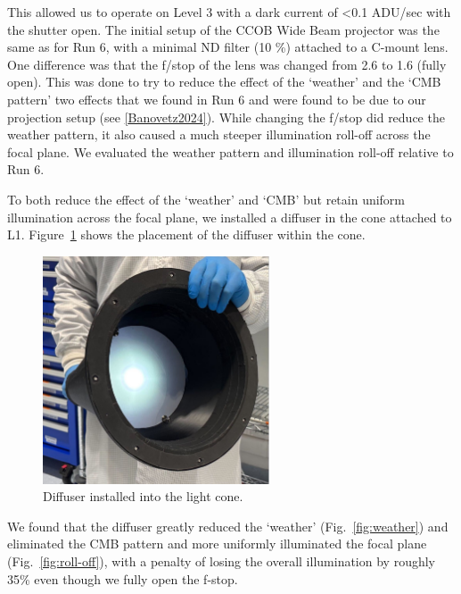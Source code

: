 This allowed us to operate on Level 3 with a dark current of
\textless0.1 ADU/sec with the shutter open. The initial setup of the
CCOB Wide Beam projector was the same as for Run 6, with a minimal ND filter (10 \%)
attached to a C-mount lens. One difference was that the f/stop of the lens
was changed from 2.6 to 1.6 (fully open). This was done to try to
reduce the effect of the `weather' and
the `CMB pattern' two effects that we
found in Run 6 and were found to be due to our projection setup (see
\hyperref[Banovetz2024]{{[}Banovetz2024{]}}). While changing  the f/stop  did
reduce the weather pattern, it also caused a much steeper illumination roll-off
across the focal plane. We evaluated the weather pattern and illumination roll-off relative to Run 6.


To both reduce the effect of the
`weather' and
`CMB' but retain uniform illumination
across the focal plane, we installed a diffuser in the cone attached to
L1. Figure~\ref{fig:diffuser} shows the placement of the diffuser within the cone.

\begin{figure}
\centering
\includegraphics[width=0.6\textwidth]{figures/Diffuser.jpg}
\caption{Diffuser installed into the light cone.}
\label{fig:diffuser}
\end{figure}

We found that the diffuser greatly reduced the `weather' (Fig.~\ref{fig:weather}) and eliminated the CMB pattern and more uniformly illuminated the focal plane (Fig.~\ref{fig:roll-off}), with a penalty of losing the overall illumination by roughly 35\% even though we fully open the f-stop.


